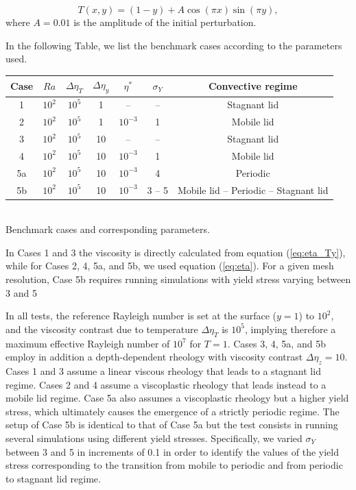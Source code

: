 \begin{equation}
T(x,y) = (1-y) + A \cos(\pi x)\sin(\pi y), \label{eq:initemp}
\end{equation}
where $A=0.01$ is the amplitude of the initial perturbation.


In the following Table, we list the benchmark cases according to the parameters used. 
\begin{center}
\begin{tabular}{c c c c c c c} 
\hline
Case & $Ra$ & $\Delta\eta_T$ & $\Delta\eta_y$ & $\eta^*$ & $\sigma_Y$ & Convective regime \\
\hline
1   & $10^2$ & $10^5$    & 1  & -- & --             & Stagnant lid    \\
2   & $10^2$ & $10^5$    & 1  & $10^{-3}$ & 1       & Mobile lid \\
3   & $10^2$ & $10^5$    & 10 & --  & --            & Stagnant lid \\
4   & $10^2$ & $10^5$    & 10 & $10^{-3}$ & 1       & Mobile lid  \\
5a  & $10^2$ & $10^5$    & 10 & $10^{-3}$ & 4       & Periodic  \\
5b  & $10^2$ & $10^5$    & 10 & $10^{-3}$ & 3 -- 5  & Mobile lid -- Periodic -- Stagnant lid \\
\hline
\end{tabular}\\
{\small Benchmark cases and corresponding parameters.} 
\end{center}

In Cases 1 and 3 the viscosity is directly calculated from equation (\ref{eq:eta_Ty}), 
while for Cases 2, 4, 5a, and 5b, we used equation (\ref{eq:eta}). For a given mesh resolution, 
Case 5b requires running simulations with yield stress varying between 3 and 5


In all tests, the reference Rayleigh number is set at the surface ($y=1$) to $10^2$, and the viscosity contrast due to temperature $\Delta\eta_T$ is $10^5$, implying therefore a maximum effective Rayleigh number of $10^7$ for $T=1$. Cases 3, 4, 5a, and 5b employ in addition a depth-dependent rheology with viscosity contrast  $\Delta\eta_z=10$. Cases 1 and 3 assume a linear viscous rheology that leads to a stagnant lid regime. Cases 2 and 4 assume a viscoplastic rheology that leads instead to a mobile lid regime. Case 5a also assumes a viscoplastic rheology but a higher yield stress, which ultimately causes the emergence of a strictly periodic regime. The setup of Case 5b is identical to that of Case 5a but the test consists in running several simulations using different yield stresses. Specifically, we varied $\sigma_Y$ between 3 and 5 in increments of 0.1 in order to identify the values of the yield stress corresponding to the transition from mobile to periodic and from periodic to stagnant lid regime. 

